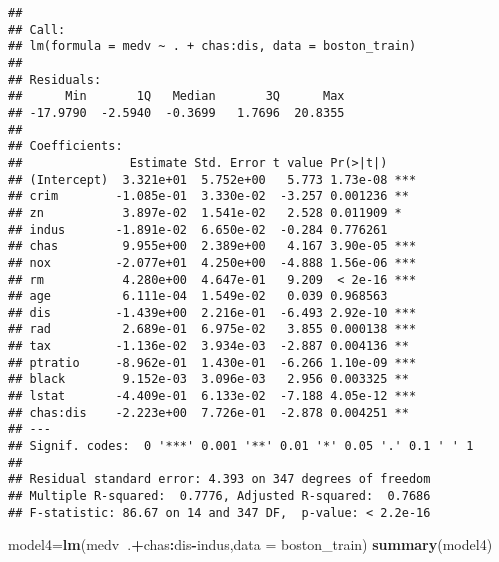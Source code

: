 \documentclass[
]{article}
\newenvironment{Shaded}{\begin{snugshade}}{\end{snugshade}}
\newcommand{\DataTypeTok}[1]{\textcolor[rgb]{0.13,0.29,0.53}{#1}}
\newcommand{\KeywordTok}[1]{\textcolor[rgb]{0.13,0.29,0.53}{\textbf{#1}}}
\newcommand{\NormalTok}[1]{#1}
\newcommand{\OperatorTok}[1]{\textcolor[rgb]{0.81,0.36,0.00}{\textbf{#1}}}
\begin{document}
\begin{verbatim}
## 
## Call:
## lm(formula = medv ~ . + chas:dis, data = boston_train)
## 
## Residuals:
##      Min       1Q   Median       3Q      Max 
## -17.9790  -2.5940  -0.3699   1.7696  20.8355 
## 
## Coefficients:
##               Estimate Std. Error t value Pr(>|t|)    
## (Intercept)  3.321e+01  5.752e+00   5.773 1.73e-08 ***
## crim        -1.085e-01  3.330e-02  -3.257 0.001236 ** 
## zn           3.897e-02  1.541e-02   2.528 0.011909 *  
## indus       -1.891e-02  6.650e-02  -0.284 0.776261    
## chas         9.955e+00  2.389e+00   4.167 3.90e-05 ***
## nox         -2.077e+01  4.250e+00  -4.888 1.56e-06 ***
## rm           4.280e+00  4.647e-01   9.209  < 2e-16 ***
## age          6.111e-04  1.549e-02   0.039 0.968563    
## dis         -1.439e+00  2.216e-01  -6.493 2.92e-10 ***
## rad          2.689e-01  6.975e-02   3.855 0.000138 ***
## tax         -1.136e-02  3.934e-03  -2.887 0.004136 ** 
## ptratio     -8.962e-01  1.430e-01  -6.266 1.10e-09 ***
## black        9.152e-03  3.096e-03   2.956 0.003325 ** 
## lstat       -4.409e-01  6.133e-02  -7.188 4.05e-12 ***
## chas:dis    -2.223e+00  7.726e-01  -2.878 0.004251 ** 
## ---
## Signif. codes:  0 '***' 0.001 '**' 0.01 '*' 0.05 '.' 0.1 ' ' 1
## 
## Residual standard error: 4.393 on 347 degrees of freedom
## Multiple R-squared:  0.7776, Adjusted R-squared:  0.7686 
## F-statistic: 86.67 on 14 and 347 DF,  p-value: < 2.2e-16
\end{verbatim}

\begin{Shaded}
\begin{Highlighting}[]
\NormalTok{model4=}\KeywordTok{lm}\NormalTok{(medv}\OperatorTok{~}\NormalTok{.}\OperatorTok{+}\NormalTok{chas}\OperatorTok{:}\NormalTok{dis}\OperatorTok{-}\NormalTok{indus,}\DataTypeTok{data =}\NormalTok{ boston_train)}
\KeywordTok{summary}\NormalTok{(model4)}
\end{Highlighting}
\end{Shaded}
\end{document}
